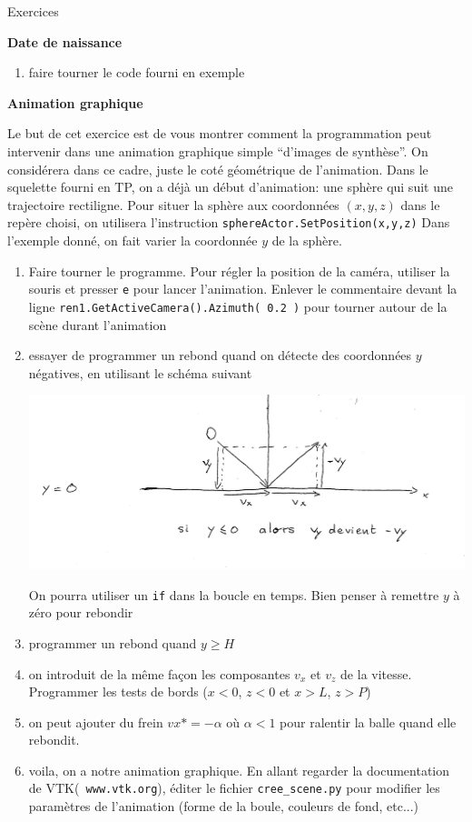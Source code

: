 \documentclass[12pt]{letter}
\begin{document}
\begin{center}
{\Large Exercices  }
\end{center}

\textbf{Date de naissance}
\begin{enumerate}
   \item faire tourner le code fourni en exemple
\end{enumerate}

\textbf{Animation graphique}

 Le but de cet exercice est de vous montrer comment la programmation peut intervenir dans une animation graphique simple ``d'images de synthèse''.
 On considérera dans ce cadre, juste le coté géométrique de l'animation. Dans le squelette fourni en TP, on a déjà un début d'animation: 
 une sphère qui suit une trajectoire rectiligne. 
 Pour situer la sphère aux coordonnées $(x,y,z)$ dans le repère choisi, on utilisera l'instruction \texttt{sphereActor.SetPosition(x,y,z)}
 Dans l'exemple donné, on fait varier la coordonnée $y$ de la sphère. 

 \begin{enumerate} 
 
    \item Faire tourner le programme. Pour régler la position de la caméra, utiliser
    la souris et presser \texttt{e} pour lancer l'animation. Enlever le commentaire devant la ligne
    \texttt{ren1.GetActiveCamera().Azimuth( 0.2 )} pour tourner autour de la scène durant l'animation
    \item essayer de programmer un rebond quand on détecte des coordonnées $y$ négatives, en utilisant le schéma suivant 
   \begin{center}
     \includegraphics[width=0.8\linewidth]{rebond.pdf}
   \end{center}
   On pourra utiliser un \texttt{if} dans la boucle en temps. Bien penser à remettre $y$ à zéro pour rebondir
   \item programmer un rebond quand $y \geqslant H$
   \item on introduit de la même façon les composantes $v_x$ et $v_z$ de la vitesse. Programmer les tests de bords ($x <0$, $z < 0$ et $x > L$, $z > P$)
   \item on peut ajouter du frein $vx *= -\alpha$ où $\alpha < 1$ pour ralentir la balle quand elle rebondit.
   \item voila, on a notre animation graphique. En allant regarder la documentation de VTK(\texttt{ www.vtk.org}), éditer le fichier \texttt{cree\_scene.py}
   pour modifier les paramètres de l'animation (forme de la boule, couleurs de fond, etc...)
    
  \end{enumerate}
\end{document}
